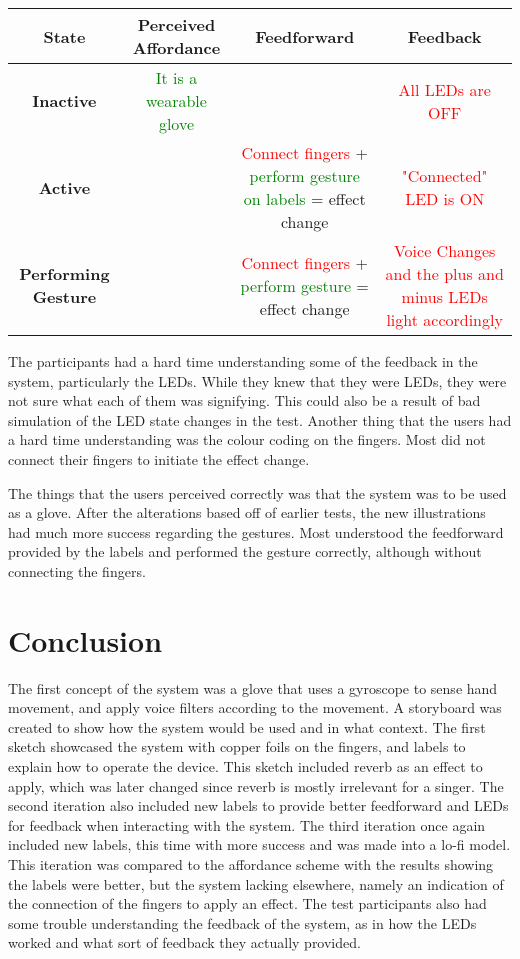 \begin{center}
  \begin{tabular}{| c{2cm} | c{3cm} | c{3cm} | c{3cm} |}
    \hline
    \textbf{State} & \textbf{Perceived Affordance} & \textbf{Feedforward} & \textbf{Feedback} \\ \hline
    \textbf{Inactive} & \textcolor{green}{It is a wearable glove} & & \textcolor{red}{All LEDs are OFF} \\ \hline
    \textbf{Active} &  & \textcolor{red}{Connect fingers} + \textcolor{green}{perform gesture on labels} = effect change & \textcolor{red}{"Connected" LED is ON} \\ \hline        
    \textbf{Performing Gesture} &  & \textcolor{red}{Connect fingers} + \textcolor{green}{perform gesture} = effect change & \textcolor{red}{Voice Changes and the plus and minus LEDs light accordingly} \\ \hline
  \end{tabular}
\end{center}

The participants had a hard time understanding some of the feedback in the system, particularly the LEDs. While they knew that they were LEDs, they were not sure what each of them was signifying. This could also be a result of bad simulation of the LED state changes in the test.
Another thing that the users had a hard time understanding was the colour coding on the fingers. Most did not connect their fingers to initiate the effect change.

The things that the users perceived correctly was that the system was to be used as a glove. After the alterations based off of earlier tests, the new illustrations had much more success regarding the gestures. Most understood the feedforward provided by the labels and performed the gesture correctly, although without connecting the fingers.

\section{Conclusion}

The first concept of the system was a glove that uses a gyroscope to sense hand movement, and apply voice filters according to the movement. A storyboard was created to show how the system would be used and in what context. The first sketch showcased the system with copper foils on the fingers, and labels to explain how to operate the device. This sketch included reverb as an effect to apply, which was later changed since reverb is mostly irrelevant for a singer. The second iteration also included new labels to provide better feedforward and LEDs for feedback when interacting with the system. The third iteration once again included new labels, this time with more success and was made into a lo-fi model. This iteration was compared to the affordance scheme with the results showing the labels were better, but the system lacking elsewhere, namely an indication of the connection of the fingers to apply an effect. The test participants also had some trouble understanding the feedback of the system, as in how the LEDs worked and what sort of feedback they actually provided.
